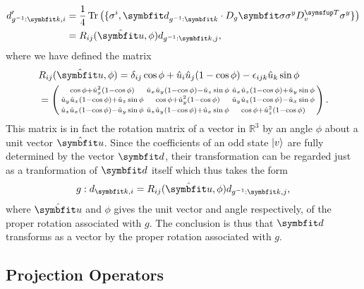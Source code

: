 \begin{equation}
    \label{eq:Group:pdRep:transformedD}
    \begin{split}
        d'_{g^{-1}:\v{k},i} &= \frac{1}{4}\tr\big(\{\sigma^i, \v{d}_{g^{-1}:\v{k}}\cdot D_g\v{\sigma}\sigma^yD_v^\trans\sigma^y\}\big)\\
        &= R_{ij}(\hat{\v{u}},\phi)d_{g^{-1}:\v{k},j},
    \end{split}
\end{equation}
where we have defined the matrix
\begin{equation}
    \label{eq:Group:pdRep:rotMatrixIndices}
    \begin{split}
        &R_{ij}(\hat{\v{u}},\phi) = \delta_{ij}\cos\phi + \hat{u}_i\hat{u}_j(1-\cos\phi)-\epsilon_{ijk}\hat{u}_k\sin\phi\\
        & = 
        \left(\begin{smallmatrix}
            \cos\phi + \hat{u}_x^2(1-\cos\phi) & \hat{u}_x\hat{u}_y(1-\cos\phi)-\hat{u}_z\sin\phi & \hat{u}_x\hat{u}_z(1-\cos\phi)+\hat{u}_y\sin\phi\\
            \hat{u}_y\hat{u}_x(1-\cos\phi)+\hat{u}_z\sin\phi & \cos\phi+\hat{u}_y^2(1-\cos\phi) & \hat{u}_y\hat{u}_z(1-\cos\phi)-\hat{u}_x\sin\phi\\
            \hat{u}_z\hat{u}_x(1-\cos\phi)-\hat{u}_y\sin\phi & \hat{u}_z\hat{u}_y(1-\cos\phi)+\hat{u}_x\sin\phi & \cos\phi+\hat{u}_z^2(1-\cos\phi)
        \end{smallmatrix}\right).
    \end{split}
\end{equation}
This matrix is in fact the rotation matrix of a vector in $\mathbb{R}^3$ by an angle $\phi$ about a unit vector $\hat{\v{u}}$. Since the coefficients
 of an odd state $\lvert v \rangle$ are fully determined by the vector $\v{d}$, their transformation can be regarded just as a tranformation of $\v{d}$ itself
 which thus takes the form
\begin{equation}
    \label{eq:Group:pdRep:dTranformation}
    g:d_{\v{k},i} = R_{ij}(\hat{\v{u}},\phi)d_{g^{-1}:\v{k},j},
\end{equation}
where $\hat{\v{u}}$ and $\phi$ gives the unit vector and angle respectively, of the proper rotation associated with $g$. The conclusion is thus that
$\v{d}$ transforms as a vector by the proper rotation associated with $g$.

\subsection{Projection Operators}
\label{sec:Group:Pro}

